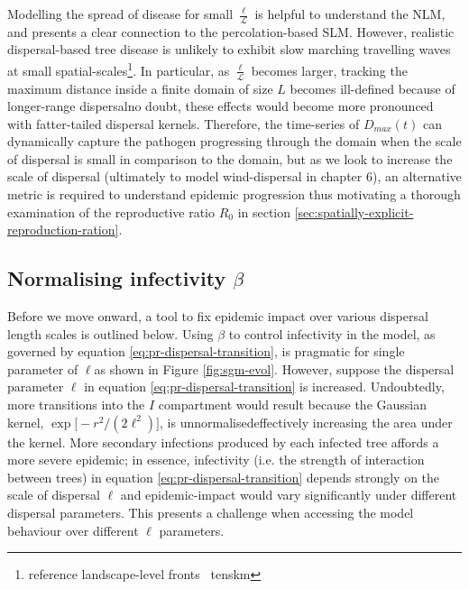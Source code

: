 Modelling the spread of disease for small $\frac{\ell}{\mathcal{L}}$ is helpful to understand the NLM, and presents a clear connection to the percolation-based SLM.
However, realistic dispersal-based tree disease is unlikely to exhibit slow marching travelling waves at small spatial-scales\footnote{reference landscape-level fronts ~tenskm}.
In particular, as $\frac{\ell}{\mathcal{L}}$ becomes larger, tracking the maximum distance inside a finite domain of size $L$ becomes ill-defined 
because of longer-range dispersal\textemdash no doubt, these effects would become more pronounced with fatter-tailed dispersal kernels.
Therefore, the time-series of $D_{max}(t)$ can dynamically capture the pathogen progressing through the domain when the scale of dispersal is small in comparison to the domain, but as we look to increase the scale of dispersal (ultimately to model wind-dispersal in chapter 6), an alternative metric is required to understand epidemic progression\textemdash
thus motivating a thorough examination of the reproductive ratio $R_0$ in section \ref{sec:spatially-explicit-reproduction-ration}.

\subsection{Normalising infectivity $\beta$}

Before we move onward, a tool to fix epidemic impact over various dispersal length scales is outlined below.
Using $\beta$ to control infectivity in the model, as governed by equation \ref{eq:pr-dispersal-transition}, is pragmatic for single parameter of $\ell$\textemdash as shown in Figure \ref{fig:sgm-evol}.
However, suppose the dispersal parameter $\ell$ in equation \ref{eq:pr-dispersal-transition} is increased. 
Undoubtedly, more transitions into the $I$ compartment would result because the Gaussian kernel, $\exp\big[-r^2/(2\ell^2)\big]$, is unnormalised\textemdash effectively increasing the area under the kernel.
More secondary infections produced by each infected tree affords a more severe epidemic; in essence, infectivity (i.e. the strength of interaction between trees) in equation \ref{eq:pr-dispersal-transition} depends strongly on the scale of dispersal $\ell$ and epidemic-impact would vary significantly under different dispersal parameters.
This presents a challenge when accessing the model behaviour over different $\ell$ parameters.

